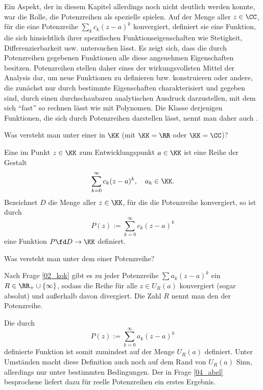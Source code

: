 Ein Aspekt, der in diesem Kapitel allerdings noch nicht 
deutlich werden konnte, war die Rolle, 
die Potenzreihen als spezielle  
spielen. Auf der Menge aller $z\in\CC$, für 
die eine Potenzreihe $\sum_k c_k(z-a)^k$ konvergiert, 
definiert sie eine Funktion, die sich hinsichtlich ihrer spezifischen 
Funktionseigenschaften wie Stetigkeit, 
Differenzierbarkeit usw. untersuchen lässt. Es zeigt sich, dass 
die durch Potenzreihen gegebenen Funktionen alle diese angenehmen 
Eigenschaften besitzen. 
Potenzreihen stellen daher eines der wirkungsvollsten Mittel der Analysis dar, 
um neue Funktionen zu definieren bzw. konstruieren 
oder andere, die zunächst nur durch 
bestimmte Eigenschaften charakterisiert und gegeben sind, 
durch einen durchschaubaren analytischen Ausdruck darzustellen, 
mit dem sich "`fast"' so rechnen lässt wie mit Polynomen. Die 
Klasse derjenigen Funktionen, die sich durch Potenzreihen darstellen 
lässt, nennt man daher auch .


\begin{frage}
Was versteht man unter einer  in $\KK$ 
(mit $\KK=\RR$ oder $\KK=\CC$)?
\end{frage}

\begin{antwort}
Eine  im Punkt $z\in \KK$ zum Entwicklungspunkt 
$a\in \KK$ ist eine Reihe der Gestalt  
\[
\sum_{k=0}^\infty c_k(z-a)^k,\quad{a_k \in \KK}.
\]
Bezeichnet $D$ die Menge aller $z\in\KK$, für die die Potenzreihe 
konvergiert, so ist durch 
\[
P(z) := \sum_{k=0}^\infty c_k(z-a)^k
\]
eine Funktion $P\fd D\to\KK$ definiert. 
\AntEnd
\end{antwort}

\begin{frage}
Was versteht man unter dem  einer Potenzreihe?
\end{frage}

\begin{antwort}
 Nach Frage \ref{02_kok} gibt es zu jeder Potenzreihe 
$\sum a_k(z-a)^k$ ein $R\in \RR_+\cup\{\infty\}$, sodass die Reihe für alle 
$z\in U_R(a)$ konvergiert (sogar absolut) und außerhalb davon 
divergiert. 
Die Zahl $R$ nennt man den  der Potenzreihe. 

Die durch 
\[
P(z):=\sum_{k=0}^\infty a_k(z-a)^k
\]
definierte Funktion ist somit 
zumindest auf der Menge $U_R(a)$ definiert. Unter Umständen  
macht diese Definition auch noch auf dem Rand von $U_R(a)$ Sinn, 
allerdings nur unter bestimmten Bedingungen. Der in Frage 
\ref{04_abel} besprochene 
 liefert dazu für 
reelle Potenzreihen ein erstes Ergebnis.\AntEnd 
  
\end{antwort}

